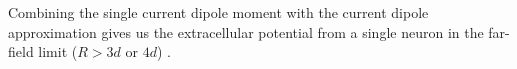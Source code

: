 \documentclass[preprint,10pt,authoryear]{elsarticle}
\begin{document}
Combining the single current dipole moment with the current dipole approximation gives us the extracellular potential from a single neuron in the far-field limit ($R>3d$ or $4d$) \citep{NUNEZ2006}.




%
%
%
\end{document}
